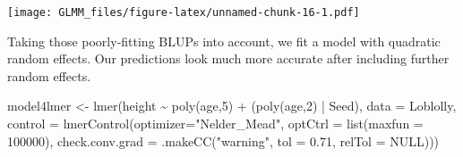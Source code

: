 \documentclass[
]{book}
\newenvironment{Shaded}{\begin{snugshade}}{\end{snugshade}}
\newcommand{\AttributeTok}[1]{\textcolor[rgb]{0.77,0.63,0.00}{#1}}
\newcommand{\ConstantTok}[1]{\textcolor[rgb]{0.00,0.00,0.00}{#1}}
\newcommand{\DecValTok}[1]{\textcolor[rgb]{0.00,0.00,0.81}{#1}}
\newcommand{\FloatTok}[1]{\textcolor[rgb]{0.00,0.00,0.81}{#1}}
\newcommand{\FunctionTok}[1]{\textcolor[rgb]{0.00,0.00,0.00}{#1}}
\newcommand{\NormalTok}[1]{#1}
\newcommand{\OtherTok}[1]{\textcolor[rgb]{0.56,0.35,0.01}{#1}}
\newcommand{\SpecialCharTok}[1]{\textcolor[rgb]{0.00,0.00,0.00}{#1}}
\newcommand{\StringTok}[1]{\textcolor[rgb]{0.31,0.60,0.02}{#1}}
\begin{document}
\begin{Shaded}
\end{Shaded}

\texttt{[image: GLMM\_files/figure-latex/unnamed-chunk-16-1.pdf]}

Taking those poorly-fitting BLUPs into account, we fit a model with quadratic random effects. Our predictions look much more accurate after including further random effects.

\begin{Shaded}
\begin{Highlighting}[]
\NormalTok{model4lmer }\OtherTok{\textless{}{-}} \FunctionTok{lmer}\NormalTok{(height }\SpecialCharTok{\textasciitilde{}} \FunctionTok{poly}\NormalTok{(age,}\DecValTok{5}\NormalTok{) }\SpecialCharTok{+}\NormalTok{ (}\FunctionTok{poly}\NormalTok{(age,}\DecValTok{2}\NormalTok{) }\SpecialCharTok{|}\NormalTok{ Seed), }\AttributeTok{data =}\NormalTok{ Loblolly, }\AttributeTok{control =} \FunctionTok{lmerControl}\NormalTok{(}\AttributeTok{optimizer=}\StringTok{"Nelder\_Mead"}\NormalTok{, }\AttributeTok{optCtrl =} \FunctionTok{list}\NormalTok{(}\AttributeTok{maxfun =} \DecValTok{100000}\NormalTok{), }\AttributeTok{check.conv.grad =} \FunctionTok{.makeCC}\NormalTok{(}\StringTok{"warning"}\NormalTok{, }\AttributeTok{tol =} \FloatTok{0.71}\NormalTok{, }\AttributeTok{relTol =} \ConstantTok{NULL}\NormalTok{)))}
\end{Highlighting}
\end{Shaded}
\end{document}
